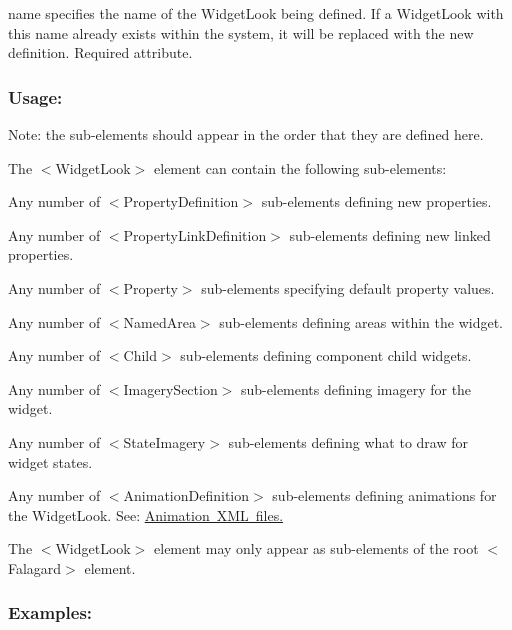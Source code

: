 \begin{DoxyItemize}
\item {\ttfamily name} specifies the name of the Widget\+Look being defined. If a Widget\+Look with this name already exists within the system, it will be replaced with the new definition. Required attribute.\end{DoxyItemize}
\hypertarget{fal_element_ref_fal_elem_ref_sec_39_3}{}\subsubsection{Usage\+:}\label{fal_element_ref_fal_elem_ref_sec_39_3}
Note\+: the sub-\/elements should appear in the order that they are defined here.


\begin{DoxyItemize}
\item The {\ttfamily $<$Widget\+Look$>$} element can contain the following sub-\/elements\+: 
\begin{DoxyItemize}
\item Any number of {\ttfamily $<$Property\+Definition$>$} sub-\/elements defining new properties. 
\item Any number of {\ttfamily $<$Property\+Link\+Definition$>$} sub-\/elements defining new linked properties. 
\item Any number of {\ttfamily $<$Property$>$} sub-\/elements specifying default property values. 
\item Any number of {\ttfamily $<$Named\+Area$>$} sub-\/elements defining areas within the widget. 
\item Any number of {\ttfamily $<$Child$>$} sub-\/elements defining component child widgets. 
\item Any number of {\ttfamily $<$Imagery\+Section$>$} sub-\/elements defining imagery for the widget. 
\item Any number of {\ttfamily $<$State\+Imagery$>$} sub-\/elements defining what to draw for widget states. 
\item Any number of {\ttfamily $<$Animation\+Definition$>$} sub-\/elements defining animations for the Widget\+Look. See\+: \mbox{\hyperlink{xml_animation}{Animation X\+ML files.}} 
\end{DoxyItemize}


\item The {\ttfamily $<$Widget\+Look$>$} element may only appear as sub-\/elements of the root {\ttfamily $<$Falagard$>$} element. 
\end{DoxyItemize}\hypertarget{fal_element_ref_fal_elem_ref_sec_39_4}{}\subsubsection{Examples\+:}\label{fal_element_ref_fal_elem_ref_sec_39_4}
